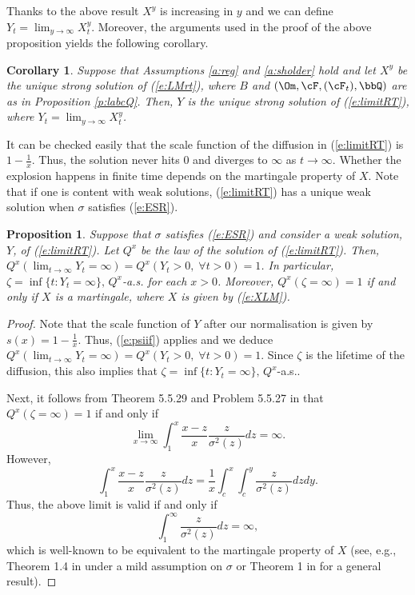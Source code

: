 \documentclass[11pt,reqno]{amsart}
\numberwithin{equation}{section}
\newtheorem{corollary}{Corollary}[section]
\newtheorem{proposition}{Proposition}[section]
\def\rar{\rightarrow}
\begin{document}
Thanks to the above result $X^y$ is increasing in $y$ and we can define $Y_t= \lim_{y \rar \infty}X^y_t$. Moreover, the arguments used in the proof of the above proposition yields the following corollary. 
\begin{corollary}\label{c:rtlimit} Suppose that Assumptions \ref{a:reg} and \ref{a:sholder} hold and let $X^y$ be the unique strong solution of (\ref{e:LMrt}), where $B$ and $(\Om, \cF, (\cF_t), \bbQ)$ are as in Proposition \ref{p:labcQ}. Then, $Y$ is the unique strong solution of (\ref{e:limitRT}), where $Y_t=\lim_{y \rar \infty}X^y_t$.
\end{corollary}
It can be checked easily that the scale function of the diffusion in (\ref{e:limitRT}) is $1-\frac{1}{x}$. Thus, the solution never hits $0$ and diverges to $\infty$ as $t \rar \infty$. Whether the explosion happens in finite time depends on the martingale property of $X$. Note that if one is content with weak solutions, (\ref{e:limitRT}) has a unique weak solution when $\sigma$ satisfies (\ref{e:ESR}).
\begin{proposition} \label{p:Xvshtr} Suppose that $\sigma$ satisfies (\ref{e:ESR}) and consider a weak solution,  $Y$, of  (\ref{e:limitRT}). Let $Q^x$ be the law of the solution of (\ref{e:limitRT}). Then, $Q^x(\lim_{t \rar \infty}Y_t=\infty)=Q^x(Y_t>0, \; \forall t>0)=1$. In particular, $\zeta=\inf\{t: Y_t =\infty\},\, Q^x$-a.s. for each $x >0$. Moreover, $Q^x(\zeta=\infty)=1$ if and only if $X$ is a martingale, where $X$ is given by (\ref{e:XLM}).
\end{proposition}
\begin{proof}
Note that the scale function of $Y$ after our normalisation is given by $s(x) =1-\frac{1}{x}$. Thus, (\ref{e:psiif}) applies and we deduce $Q^x(\lim_{t \rar \infty}Y_t=\infty)=Q^x(Y_t>0, \; \forall t>0)=1$. Since $\zeta$ is the lifetime of the diffusion, this also implies that $\zeta=\inf\{t: Y_t =\infty\},\, Q^x$-a.s.. 

Next, it follows from Theorem 5.5.29 and Problem 5.5.27 in \cite{KS} that $Q^x(\zeta=\infty)=1$ if and only if
\[
\lim_{x \rar \infty}\int_1^{x}\frac{x-z}{x}\frac{z}{\sigma^2(z)}dz =\infty.
\]
However, 
\[
\int_1^{x}\frac{x-z}{x}\frac{z}{\sigma^2(z)}dz=\frac{1}{x}\int_c^x\int_c^y \frac{z}{\sigma^2(z)}dzdy.
\]
Thus, the above limit is valid  if and only if 
\[
\int_1^{\infty}\frac{z}{\sigma^2(z)}dz =\infty,
\]
which is well-known to be equivalent to the martingale property of $X$ (see, e.g., Theorem 1.4 in \cite{DelShir} under a mild assumption on $\sigma$ or Theorem 1 in \cite{Kotani} for a general result).
\end{proof}
\end{document}
